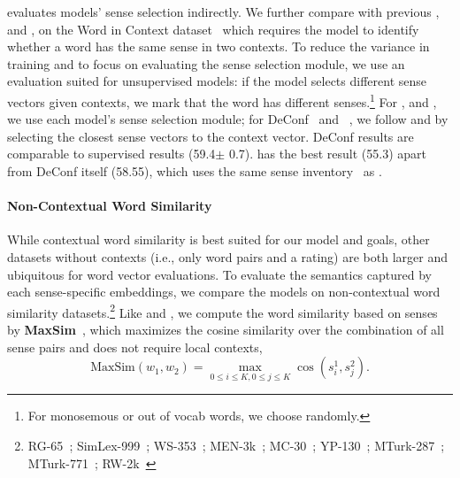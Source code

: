  evaluates models' sense selection indirectly. We
further compare \gasi{-$\beta$} with previous ,
 and , on the Word in Context
dataset~\citep[\wic{}]{pilehvar2018wic} which requires the model to
identify whether a word has the same sense in two contexts.
To reduce the variance in
training and to focus on evaluating the sense selection module, we use
an evaluation suited for unsupervised models: if the model selects
different sense vectors given contexts, we mark that the word has different
senses.\footnote{For monosemous or out of vocab words, we choose randomly.}
For ,  and \gasi{-$\beta$}, 
we use each model's sense selection module; for DeConf~\citep{pilehvar2016} and ~\citep{sw2v}, we follow \citet{pilehvar2018wic} and \citet{makesense} by
selecting the closest sense vectors to the context vector.
DeConf results
are comparable to supervised results (59.4$\pm$ 0.7).
\gasi{-$\beta$} has the best result (55.3) apart from DeConf itself
(58.55), which uses the same sense
inventory~\citep[WordNet]{wordnet2} as \wic{}.



 
\paragraph{Non-Contextual Word Similarity}

While contextual word similarity is best suited for our model and
goals, other datasets without contexts (i.e., only word
pairs and a rating) are both larger and ubiquitous for word vector
evaluations.
To evaluate the semantics captured by each sense-specific embeddings, we compare the models on non-contextual word similarity
datasets.\footnote{RG-65~\citep{rubenstein1965contextual};
SimLex-999~\citep{hill2015simlex};
WS-353~\citep{finkelstein2002placing};
MEN-3k~\citep{bruni2014multimodal};
MC-30~\citep{miller1991contextual}; YP-130~\citep{yang2006verb};
MTurk-287~\citep{radinsky2011word}; MTurk-771~\citep{halawi2012large};
RW-2k~\citep{luong2013better}}
Like  and , we compute the word
similarity based on senses by \textbf{MaxSim}~\citep{Reisinger2010},
which maximizes the cosine similarity over the combination of all
sense pairs and does not require local contexts,
\begin{equation}
\text{MaxSim}(w_1, w_2) = \max_{0\le i \le K, 0\le j \le K}  \cos(s_i^1, s_j^2).
\label{eq:maxsim}
\end{equation}
 
